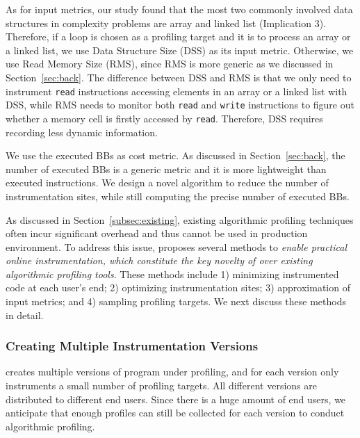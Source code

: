 As for input metrics, our study found that the most two commonly involved 
data structures in complexity problems 
are array and linked list (Implication 3). 
Therefore, if a loop is chosen as a profiling target 
and it is to process an array 
or a linked list, we use Data Structure Size (DSS) as its input metric. 
Otherwise, we use Read Memory Size (RMS), 
since RMS is more generic as we discussed in Section~\ref{sec:back}. 
The difference between DSS and RMS is that 
we only need to instrument \texttt{read} instructions accessing elements 
in an array or a linked list with DSS,
while RMS needs to monitor both \texttt{read} and \texttt{write}
instructions to figure out whether a memory cell is 
firstly accessed by \texttt{read}.
Therefore, DSS requires recording less dynamic information. 


We use the executed BBs as cost metric. 
As discussed in Section~\ref{sec:back}, 
the number of executed BBs is a generic metric 
and it is more lightweight than executed instructions. 
We design a novel algorithm to reduce the number of instrumentation sites,
while still computing the precise number of executed BBs. 



As discussed in Section~\ref{subsec:existing}, 
existing algorithmic profiling techniques
often incur significant overhead and thus cannot be used in production
environment. To address this issue, \Tool proposes several 
methods to \emph{enable practical online instrumentation, which 
constitute the key novelty of \Tool over existing algorithmic profiling tools}.
These methods include 1) 
minimizing instrumented code at each user's end; 
2) optimizing instrumentation sites;
3) approximation of input metrics;
and 4) sampling profiling targets. 
We next discuss these methods in detail.


\subsubsection{Creating Multiple Instrumentation Versions}

\Tool creates multiple versions of program under profiling, 
and for each version \Tool only instruments a small number of 
profiling targets. 
All different versions are distributed to different end users. 
Since there is a huge amount of end users, 
we anticipate that enough profiles can still be collected 
for each version to conduct algorithmic profiling. 

